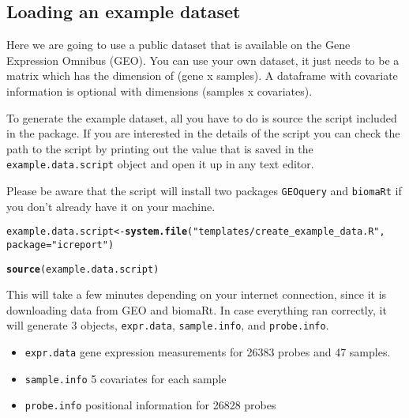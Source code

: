 \documentclass[11pt, oneside]{article}\usepackage[]{graphicx}\usepackage[]{color}
\makeatletter
\newcommand{\hlstr}[1]{\textcolor[rgb]{0.192,0.494,0.8}{#1}}%
\newcommand{\hlstd}[1]{\textcolor[rgb]{0.345,0.345,0.345}{#1}}%
\newcommand{\hlkwb}[1]{\textcolor[rgb]{0.69,0.353,0.396}{#1}}%
\newcommand{\hlkwc}[1]{\textcolor[rgb]{0.333,0.667,0.333}{#1}}%
\newcommand{\hlkwd}[1]{\textcolor[rgb]{0.737,0.353,0.396}{\textbf{#1}}}%
\newenvironment{kframe}{%
 \def\at@end@of@kframe{}%
 \ifinner\ifhmode%
  \def\at@end@of@kframe{\end{minipage}}%
  \begin{minipage}{\columnwidth}%
 \fi\fi%
 \def\FrameCommand##1{\hskip\@totalleftmargin \hskip-\fboxsep
 \colorbox{shadecolor}{##1}\hskip-\fboxsep
     \hskip-\linewidth \hskip-\@totalleftmargin \hskip\columnwidth}%
 \MakeFramed {\advance\hsize-\width
   \@totalleftmargin\z@ \linewidth\hsize
   \@setminipage}}%
 {\par\unskip\endMakeFramed%
 \at@end@of@kframe}
\newenvironment{knitrout}{}{} %
\makeatother
\begin{document}
\subsection{Loading an example dataset}

Here we are going to use a public dataset that is available on the Gene Expression Omnibus (GEO). You can use your own dataset, it just needs to be a matrix which has the dimension of (gene x samples). A dataframe with covariate information is optional with dimensions (samples x covariates).

To generate the example dataset, all you have to do is source the script included in the package. If you are interested in the details of the script you can check the path to the script by printing out the value that is saved in the \verb|example.data.script| object and open it up in any text editor.

Please be aware that the script will install two packages \verb|GEOquery| and \verb|biomaRt| if you don't already have it on your machine.

\begin{knitrout}
\color{fgcolor}\begin{kframe}
\begin{alltt}
\hlstd{example.data.script} \hlkwb{<-} \hlkwd{system.file}\hlstd{(}\hlstr{"templates/create_example_data.R"}\hlstd{,}
                                   \hlkwc{package}\hlstd{=}\hlstr{"icreport"}\hlstd{)}

\hlkwd{source}\hlstd{(example.data.script)}
\end{alltt}
\end{kframe}
\end{knitrout}



This will take a few minutes depending on your internet connection, since it is downloading data from GEO and biomaRt. In case everything ran correctly, it will generate 3 objects, \verb|expr.data|, \verb|sample.info|, and \verb|probe.info|.

\begin{itemize}
  \item \verb|expr.data| gene expression measurements for 26383 probes and 47 samples.

  \item \verb|sample.info| 5 covariates for each sample

  \item \verb|probe.info| positional information for 26828 probes
\end{itemize}
\end{document}
